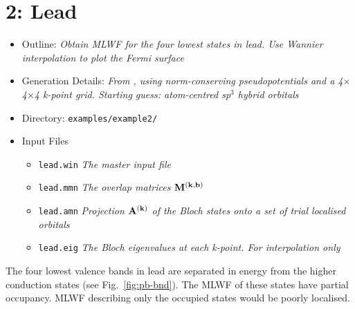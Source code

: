 \documentclass[a4paper,11pt,twoside]{article}
\begin{document}
\cleardoublepage



\section*{2: Lead}

\begin{itemize}
\item{Outline: \it{Obtain MLWF for the four lowest states
    in lead. Use Wannier interpolation to plot the Fermi surface}}
\item{Generation Details: \it{From \pwscf, using norm-conserving
    pseudopotentials and a 4$\times$4$\times$4 k-point grid. Starting
    guess: atom-centred sp$^3$ hybrid orbitals}} 
\item{Directory: {\tt examples/example2/}}
\item{Input Files}
\begin{itemize}
\item{ {\tt lead.win}  {\it The master input file}}
\item{ {\tt lead.mmn}  {\it The overlap matrices $\mathbf{M}^{(\mathbf{k},\mathbf{b})}$}}
\item{ {\tt lead.amn}  {\it Projection $\mathbf{A}^{(\mathbf{k})}$ of the Bloch states onto a set
    of trial localised orbitals}} 
\item{ {\tt lead.eig}  {\it The Bloch eigenvalues at each k-point. For
    interpolation only}} 
\end{itemize}

\end{itemize}
The four lowest valence bands in lead are separated in energy from the
higher conduction states (see Fig.~\ref{fig:pb-bnd}). The MLWF of
these states have partial occupancy. MLWF describing only the occupied
states would be poorly localised.
\end{document}
